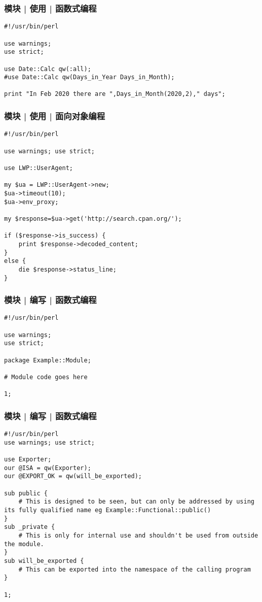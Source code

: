 \begin{frame}[fragile]
  \frametitle{模块 | 使用 | 函数式编程}
\begin{lstlisting}
#!/usr/bin/perl

use warnings;
use strict;

use Date::Calc qw(:all);
#use Date::Calc qw(Days_in_Year Days_in_Month);

print "In Feb 2020 there are ",Days_in_Month(2020,2)," days";
\end{lstlisting}
\end{frame}

\begin{frame}[fragile]
  \frametitle{模块 | 使用 | 面向对象编程}
  \begin{lstlisting}[basicstyle=\small\tt]
#!/usr/bin/perl

use warnings; use strict;

use LWP::UserAgent;
 
my $ua = LWP::UserAgent->new;
$ua->timeout(10);
$ua->env_proxy;
 
my $response=$ua->get('http://search.cpan.org/');
 
if ($response->is_success) {
    print $response->decoded_content;
}
else {
    die $response->status_line;
}
\end{lstlisting}
\end{frame}

\begin{frame}[fragile]
  \frametitle{模块 | 编写 | 函数式编程}
\begin{lstlisting}
#!/usr/bin/perl

use warnings;
use strict;

package Example::Module;

# Module code goes here

1;
\end{lstlisting}
\end{frame}

\begin{frame}[fragile]
  \frametitle{模块 | 编写 | 函数式编程}
\begin{lstlisting}[basicstyle=\scriptsize\tt,numberstyle=\scriptsize]
#!/usr/bin/perl
use warnings; use strict;

use Exporter;
our @ISA = qw(Exporter);
our @EXPORT_OK = qw(will_be_exported);

sub public {
    # This is designed to be seen, but can only be addressed by using its fully qualified name eg Example::Functional::public()
}
sub _private {
    # This is only for internal use and shouldn't be used from outside the module.
}
sub will_be_exported {
    # This can be exported into the namespace of the calling program
}

1;
\end{lstlisting}
\end{frame}

